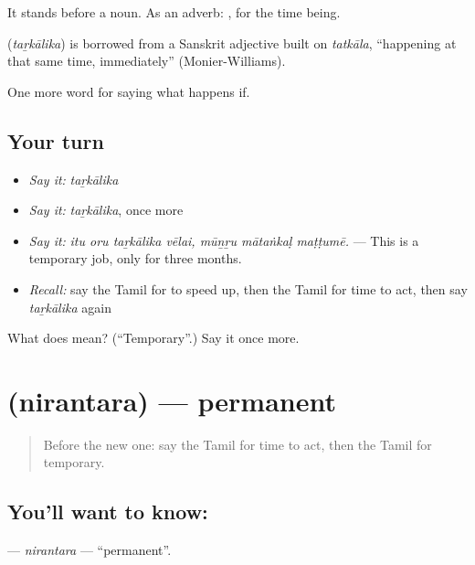 It stands before a noun. As an adverb: , for the time being.

\begin{cousinweb}
\textbf{} (\emph{taṟkālika}) is borrowed from a Sanskrit adjective built on \emph{tatkāla}, \textquotedblleft{}happening at that same time, immediately\textquotedblright{} (Monier-Williams).
\end{cousinweb}

\begin{grammarlens}[title={What you've built}]
One more word for saying what happens if.
\end{grammarlens}

\subsection*{Your turn}
\begin{itemize}
\raggedright
  \item \emph{Say it:} \emph{taṟkālika}
  \item \emph{Say it:} \emph{taṟkālika}, once more
  \item \emph{Say it:} \emph{itu oru taṟkālika vēlai, mūṉṟu mātaṅkaḷ maṭṭumē.} — This is a temporary job, only for three months.
  \item \emph{Recall:} say the Tamil for to speed up, then the Tamil for time to act, then say \emph{taṟkālika} again
\end{itemize}

\begin{tcolorbox}[breakable,colback=teal!4,colframe=teal!35!black,title={Before you move on}]
What does  mean? (\textquotedblleft{}Temporary\textquotedblright{}.) Say it once more.
\end{tcolorbox}
\section[\texorpdfstring{\ta{நிரந்தர} (nirantara)}{நிரந்தர (nirantara)}]{ (nirantara) — permanent}

\label{lesson:TA-C553-nirantara}



\begin{quote}
Before the new one: say the Tamil for time to act, then the Tamil for temporary.
\end{quote}

\subsection*{You'll want to know: }
\textbf{} — \emph{nirantara} — \textquotedblleft{}permanent\textquotedblright{}.

